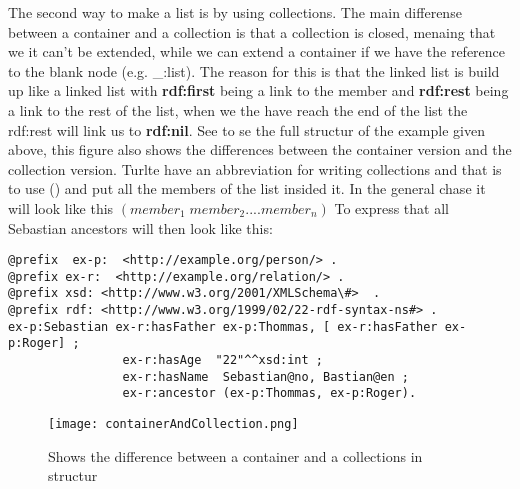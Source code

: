 The second way to make a list is by using collections. The main differense between a container 
and a collection is that a collection is closed, menaing that we it can't be extended, 
while we can extend a container if we have the reference to the blank node (e.g. \_:list). The reason 
for this is that the linked list is build up like a linked list with \textbf{rdf:first} being a link to the member
and \textbf{rdf:rest} being a link to the rest of the list, when we the have reach the end of the 
list the rdf:rest will link us to \textbf{rdf:nil}. See  to se the 
full structur of the example given above, this figure also shows the differences between the container version
and the collection version. Turlte have an abbreviation for writing collections and that is 
to use () and put all the members of the list insided it. In the general chase it will look like this 
$(member_1 \;member_2 .... member_n)$
To express that all Sebastian ancestors will then look like this:
\begin{lstlisting}[frame=single, language=turtle]
@prefix  ex-p:  <http://example.org/person/> . 
@prefix ex-r:  <http://example.org/relation/> . 
@prefix xsd: <http://www.w3.org/2001/XMLSchema\#>  . 
@prefix rdf: <http://www.w3.org/1999/02/22-rdf-syntax-ns#> .
ex-p:Sebastian ex-r:hasFather ex-p:Thommas, [ ex-r:hasFather ex-p:Roger] ; 
                ex-r:hasAge  "22"^^xsd:int ; 
                ex-r:hasName  Sebastian@no, Bastian@en ;
                ex-r:ancestor (ex-p:Thommas, ex-p:Roger).
\end{lstlisting}

\begin{figure}
    \centering
    \texttt{[image: containerAndCollection.png]}
    \caption{Shows the difference between a container and a collections in structur}
    \label{fig:containerAndCollection}
\end{figure}

